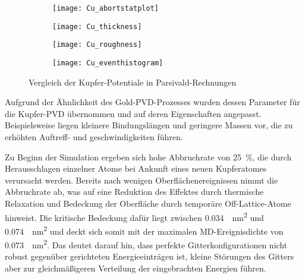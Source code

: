 \begin{figure}
  \captionsetup[subfigure]{singlelinecheck=false}
  \def\subfigwidth{0.49\textwidth}
  \begin{subfigure}[t]{\subfigwidth}
    \texttt{[image: Cu\_abortstatplot]}
    \label{fig:copperparsivald-a}
  \end{subfigure}
  \hfill
  \begin{subfigure}[t]{\subfigwidth}
    \texttt{[image: Cu\_thickness]}
    \label{fig:copperparsivald-b}
  \end{subfigure}
  \begin{subfigure}[t]{\subfigwidth}
    \texttt{[image: Cu\_roughness]}
    \label{fig:copperparsivald-c}
  \end{subfigure}
  \hfill
  \begin{subfigure}[t]{\subfigwidth}
    \texttt{[image: Cu\_eventhistogram]}
    \label{fig:copperparsivald-d}
  \end{subfigure}
  \caption{Vergleich der Kupfer-Potentiale in Parsivald-Rechnungen}
  \label{fig:copperparsivald}
\end{figure}

Aufgrund der Ähnlichkeit des Gold-PVD-Prozesses wurden dessen Parameter für die Kupfer-PVD übernommen und auf deren Eigenschaften angepasst.
Beispielsweise liegen kleinere Bindungslängen und geringere Massen vor, die zu erhöhten Auftreff- und geschwindigkeiten führen.

Zu Beginn der Simulation ergeben sich hohe Abbruchrate von \SI{25}{\percent}, die durch Herausschlagen einzelner Atome bei Ankunft eines neuen Kupferatomes verursacht werden.
Bereits nach wenigen Oberflächenereignissen nimmt die Abbruchrate ab, was auf eine Reduktion des Effektes durch thermische Relaxation und Bedeckung der Oberfläche durch temporäre Off-Lattice-Atome hinweist.
Die kritische Bedeckung dafür liegt zwischen \SI{0.034}{\per\nano\meter\squared} und \SI{0.074}{\per\nano\meter\squared} und deckt sich somit mit der maximalen MD-Ereignisdichte von \SI{0.073}{\per\nano\meter\squared}.
Das deutet darauf hin, dass perfekte Gitterkonfigurationen nicht robust gegenüber gerichteten Energieeinträgen ist, kleine Störungen des Gitters aber zur gleichmäßigeren Verteilung der eingebrachten Energien führen.

